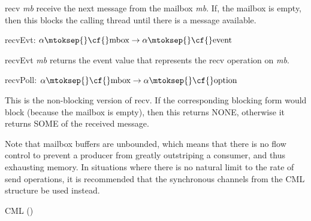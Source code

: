 \begin{descr}
\begin{speccomment}
\item {\cf \small recv \mbox{\cf \small \textit{mb}}         } 
receive the next message from the mailbox \mbox{\cf \small \textit{mb}}. 	If, the mailbox is empty, then this blocks the calling 	thread until there is a message available.     \end{speccomment}
\item {}{} {\cf recvEvt: \(\alpha\mtoksep{}\mbox{\cf{}mbox}\rightarrow \alpha\mtoksep{}\mbox{\cf{}event}\)}\label{val-MAILBOX.recvEvt}


\begin{speccomment}
\item {\cf \small recv\-Evt \mbox{\cf \small \textit{mb}}         } 
returns the event value that represents the {\cf \small recv} operation 	on \mbox{\cf \small \textit{mb}}.     \end{speccomment}
\item {}{} {\cf recvPoll: \(\alpha\mtoksep{}\mbox{\cf{}mbox}\rightarrow \alpha\mtoksep{}\mbox{\cf{}option}\)}\label{val-MAILBOX.recvPoll}


\begin{speccomment}
\item 

        This is the non-blocking version of {\cf \small recv}. 	If the corresponding blocking form would block (because the mailbox is 	empty), then this returns 	{\cf \small NONE}, otherwise it returns 	{\cf \small SOME} of the received 	message.\end{speccomment}
\end{descr}


Note that mailbox buffers are unbounded, which means that there is no flow control to prevent a producer from greatly outstriping a consumer, and thus exhausting memory. In situations where there is no natural limit to the rate of {\cf \small send} operations, it is recommended that the synchronous channels from the {\cf \small CML} structure be used instead.
\begin{seealso}
{\cf CML} (\pageref{str-CML})
\end{seealso}
